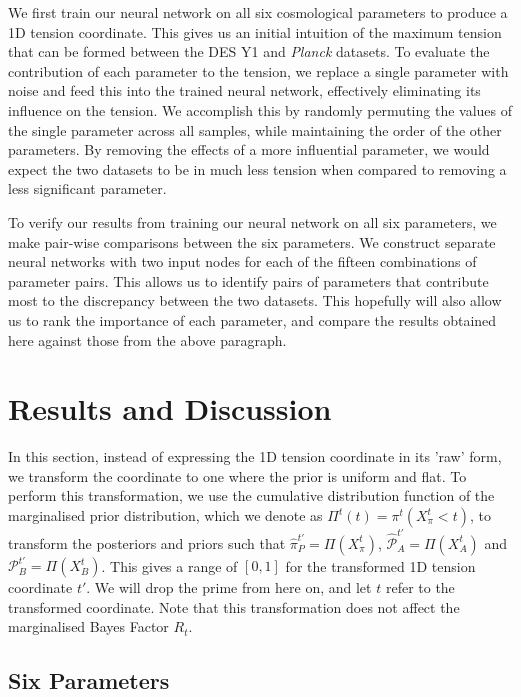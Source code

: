 \documentclass[%
 reprint,
 amsmath,amssymb,
 aps,
]{revtex4-2}
\begin{document}
We first train our neural network on all six cosmological parameters to produce a 1D tension coordinate. This gives us an initial intuition of the maximum tension that can be formed between the DES Y1 and \textit{Planck} datasets. To evaluate the contribution of each parameter to the tension, we replace a single parameter with noise and feed this into the trained neural network, effectively eliminating its influence on the tension. We accomplish this by randomly permuting the values of the single parameter across all samples, while maintaining the order of the other parameters. By removing the effects of a more influential parameter, we would expect the two datasets to be in much less tension when compared to removing a less significant parameter.

To verify our results from training our neural network on all six parameters, we make pair-wise comparisons between the six parameters. We construct separate neural networks with two input nodes for each of the fifteen combinations of parameter pairs. This allows us to identify pairs of parameters that contribute most to the discrepancy between the two datasets. This hopefully will also allow us to rank the importance of each parameter, and compare the results obtained here against those from the above paragraph.


\section{Results and Discussion}

In this section, instead of expressing the 1D tension coordinate in its 'raw' form, we transform the coordinate to one where the prior is uniform and flat. To perform this transformation, we use the cumulative distribution function of the marginalised prior distribution, which we denote as $\Pi^t(t) = \pi^t(X_\pi^t < t)$, to transform the posteriors and priors such that $\hat{\pi}^{t'}_P = \Pi(X_\pi^t)$, $\hat{\mathcal{P}}_A^{t'} = \Pi(X_A^t)$ and $\mathcal{P}_B^{t'} = \Pi(X_B^t)$. This gives a range of $[0, 1]$ for the transformed 1D tension coordinate $t'$. We will drop the prime from here on, and let $t$ refer to the transformed coordinate. Note that this transformation does not affect the marginalised Bayes Factor $R_t$.

\subsection{Six Parameters} \label{section:six}
\end{document}
